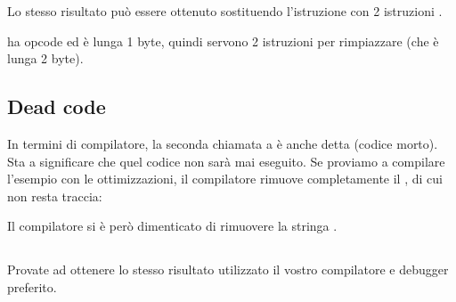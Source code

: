 


Lo stesso risultato può essere ottenuto sostituendo l'istruzione \JMP con 2 istruzioni \NOP.

\NOP ha opcode  ed è lunga 1 byte, quindi servono 2 istruzioni per rimpiazzare \JMP (che è lunga 2 byte).

\subsection{Dead code}

In termini di compilatore, la seconda chiamata a \printf è anche detta  (codice morto).
Sta a significare che quel codice non sarà mai eseguito. Se proviamo a compilare l'esempio con le ottimizzazioni, il compilatore
rimuove completamente il , di cui non resta traccia:



Il compilatore si è però dimenticato di rimuovere la stringa .


\subsection{\Exercise}


Provate ad ottenere lo stesso risultato utilizzato il vostro compilatore e debugger preferito.
